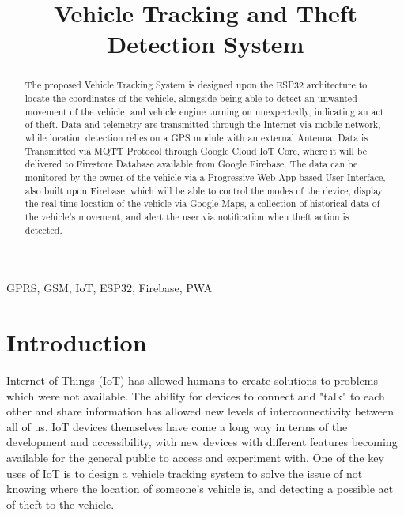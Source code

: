 \documentclass[conference]{IEEEtran}
\begin{document}
\title{Vehicle Tracking and Theft Detection System}

\author{
}



\maketitle

\begin{abstract}
The proposed Vehicle Tracking System is designed upon the ESP32 architecture to locate the coordinates of the vehicle, alongside being able to detect an unwanted movement of the vehicle, and vehicle engine turning on unexpectedly, indicating an act of theft. Data and telemetry are transmitted through the Internet via mobile network, while location detection relies on a GPS module with an external Antenna. Data is Transmitted via MQTT Protocol through Google Cloud IoT Core, where it will be delivered to Firestore Database available from Google Firebase. The data can be monitored by the owner of the vehicle via a Progressive Web App-based User Interface, also built upon Firebase, which will be able to control the modes of the device, display the real-time location of the vehicle via Google Maps, a collection of historical data of the vehicle’s movement, and alert the user via notification when theft action is detected.
\end{abstract}

\begin{IEEEkeywords}
GPRS, GSM, IoT, ESP32, Firebase, PWA
\end{IEEEkeywords}

\section{Introduction}
Internet-of-Things (IoT) has allowed humans to create solutions to problems which were not available. The ability for devices to connect and "talk" to 
each other and share information has allowed new levels of interconnectivity between all of us. IoT devices themselves have come a long way in terms of the development and accessibility, with new devices with different features becoming available for the general public to access and experiment with. 
One of the key uses of IoT is to design a vehicle tracking system to solve the issue of not knowing where the location of someone's vehicle is,
and detecting a possible act of theft to the vehicle. 
\end{document}
